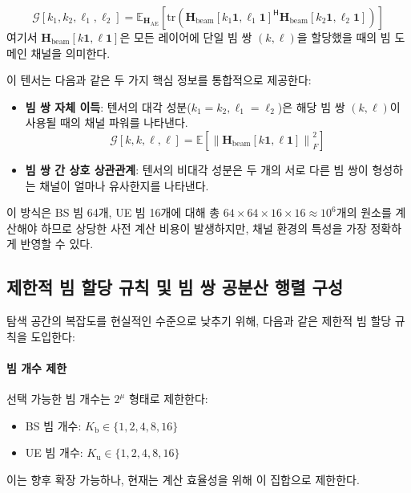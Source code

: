 \documentclass[10pt]{article}
\begin{document}
\begin{equation}
\mathcal{G}[k_1, k_2, \ell_1, \ell_2] = \mathbb{E}_{\mathbf{H}_\text{AE}}\left[ \text{tr}\left(\mathbf{H}_{\text{beam}}[k_1\mathbf{1}, \ell_1\mathbf{1}]^{\mathsf{H}} \mathbf{H}_{\text{beam}}[k_2\mathbf{1}, \ell_2\mathbf{1}]\right) \right]
\end{equation}
여기서 $\mathbf{H}_{\text{beam}}[k\mathbf{1}, \ell\mathbf{1}]$은 모든 레이어에 단일 빔 쌍 $(k, \ell)$을 할당했을 때의 빔 도메인 채널을 의미한다.

이 텐서는 다음과 같은 두 가지 핵심 정보를 통합적으로 제공한다:
\begin{itemize}
    \item \textbf{빔 쌍 자체 이득}: 텐서의 대각 성분($k_1=k_2, \ell_1=\ell_2$)은 해당 빔 쌍 $(k, \ell)$이 사용될 때의 채널 파워를 나타낸다.
    $$\mathcal{G}[k, k, \ell, \ell] = \mathbb{E}\left[ \left\|\mathbf{H}_{\text{beam}}[k\mathbf{1}, \ell\mathbf{1}]\right\|_F^2 \right]$$
    
    \item \textbf{빔 쌍 간 상호 상관관계}: 텐서의 비대각 성분은 두 개의 서로 다른 빔 쌍이 형성하는 채널이 얼마나 유사한지를 나타낸다.
\end{itemize}
이 방식은 BS 빔 64개, UE 빔 16개에 대해 총 $64 \times 64 \times 16 \times 16 \approx 10^6$개의 원소를 계산해야 하므로 상당한 사전 계산 비용이 발생하지만, 채널 환경의 특성을 가장 정확하게 반영할 수 있다.

\subsection{제한적 빔 할당 규칙 및 빔 쌍 공분산 행렬 구성}
\label{subsec:constrained_allocation}
탐색 공간의 복잡도를 현실적인 수준으로 낮추기 위해, 다음과 같은 제한적 빔 할당 규칙을 도입한다:

\paragraph{빔 개수 제한}
선택 가능한 빔 개수는 $2^{\mu}$ 형태로 제한한다:
\begin{itemize}
    \item BS 빔 개수: $K_{\text{b}} \in \{1, 2, 4, 8, 16\}$
    \item UE 빔 개수: $K_{\text{u}} \in \{1, 2, 4, 8, 16\}$
\end{itemize}
이는 향후 확장 가능하나, 현재는 계산 효율성을 위해 이 집합으로 제한한다.
\end{document}
